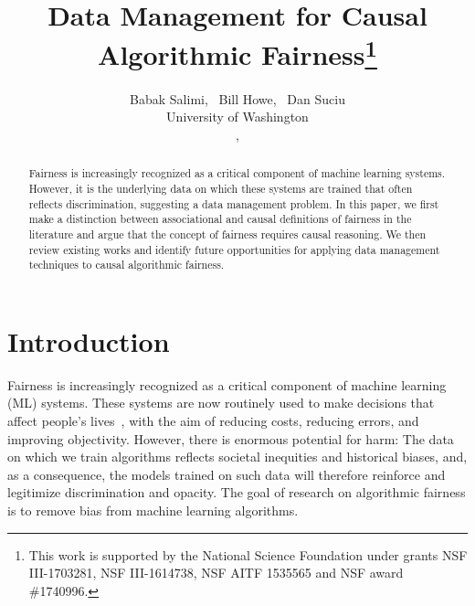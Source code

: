 \documentclass[11pt]{article}
\begin{document}
\title{Data Management for Causal Algorithmic Fairness\footnote{This work is supported by the National Science Foundation under grants NSF III-1703281, NSF III-1614738, NSF AITF 1535565 and NSF award \#1740996.}}



\author{Babak Salimi\footnotemark[1], \  Bill Howe\footnotemark[2], \ Dan Suciu\footnotemark[1] \\
University of Washington\\
,  }


\maketitle

\begin{abstract}
Fairness is increasingly recognized as a critical component of machine learning systems.  However, it is the underlying data on which these systems are trained that often reflects discrimination, suggesting a data management problem.  In this paper, we first make a distinction between associational and causal definitions of fairness in the literature and argue that the concept of fairness requires causal reasoning. We then review existing works and identify future opportunities for applying data management techniques to causal algorithmic fairness.
\end{abstract}
\section{Introduction}
Fairness is increasingly recognized as a critical component of machine learning (ML) systems.  These systems are now routinely used to make decisions that affect people's lives~\cite{courtland2018bias}, with the aim of reducing costs, reducing errors, and improving objectivity. However, there is enormous potential for harm: The data on which we train algorithms reflects societal inequities and historical biases, and, as a consequence, the models trained on such data will therefore reinforce and legitimize discrimination and opacity.  The goal of  research on algorithmic fairness is to remove bias from machine learning algorithms.  
\end{document}

